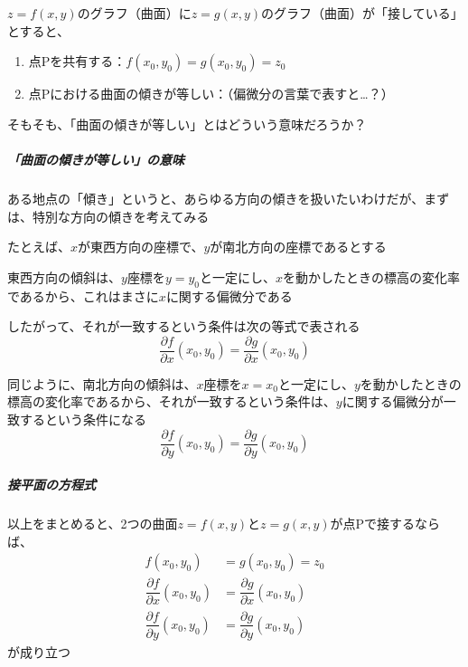 \documentclass[../book_jiriki_calc]{subfiles}
\begin{document}
$z=f(x,y)$のグラフ（曲面）に$z=g(x,y)$のグラフ（曲面）が「接している」とすると、
\begin{enumerate}
  \item 点Pを共有する：$f(x_0,y_0)=g(x_0,y_0)=z_0$
  \item 点Pにおける曲面の傾きが等しい：（偏微分の言葉で表すと…？）
\end{enumerate}

そもそも、「曲面の傾きが等しい」とはどういう意味だろうか？

\sectionline

\subparagraph{「曲面の傾きが等しい」の意味}

ある地点の「傾き」というと、あらゆる方向の傾きを扱いたいわけだが、まずは、特別な方向の傾きを考えてみる

\br

たとえば、$x$が東西方向の座標で、$y$が南北方向の座標であるとする

\br

東西方向の傾斜は、$y$座標を$y=y_0$と一定にし、$x$を動かしたときの標高の変化率であるから、これはまさに$x$に関する偏微分である

したがって、それが一致するという条件は次の等式で表される
\begin{equation*}
  \dfrac{\partial f}{\partial x}(x_0,y_0) = \dfrac{\partial g}{\partial x}(x_0,y_0)
\end{equation*}

\br

同じように、南北方向の傾斜は、$x$座標を$x=x_0$と一定にし、$y$を動かしたときの標高の変化率であるから、それが一致するという条件は、$y$に関する偏微分が一致するという条件になる
\begin{equation*}
  \dfrac{\partial f}{\partial y}(x_0,y_0) = \dfrac{\partial g}{\partial y}(x_0,y_0)
\end{equation*}

\sectionline

\subparagraph{接平面の方程式}

以上をまとめると、2つの曲面$z=f(x,y)$と$z=g(x,y)$が点Pで接するならば、
\begin{align}
  f(x_0,y_0) &= g(x_0,y_0) =z_0 \\
  \dfrac{\partial f}{\partial x}(x_0,y_0) &= \dfrac{\partial g}{\partial x}(x_0,y_0) \\
  \dfrac{\partial f}{\partial y}(x_0,y_0) &= \dfrac{\partial g}{\partial y}(x_0,y_0)
\end{align}
が成り立つ

\br
\end{document}
